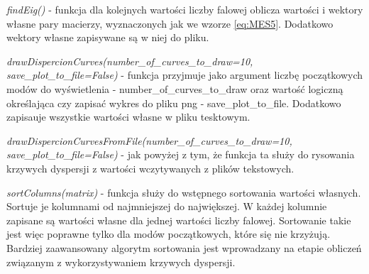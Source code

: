 \vspace {3mm}
\textit{findEig()} - funkcja dla kolejnych wartości liczby falowej oblicza wartości i wektory własne pary macierzy, wyznaczonych jak we wzorze \ref{eq:MES5}. Dodatkowo wektory własne zapisywane są w niej do pliku.

\vspace {3mm}
\textit{drawDispercionCurves(number\_of\_curves\_to\_draw=10, save\_plot\_to\_file=False)} - funkcja przyjmuje jako argument liczbę początkowych modów do wyświetlenia - number\_of\_curves\_to\_draw oraz wartość logiczną określająca czy zapisać wykres do pliku png - save\_plot\_to\_file. Dodatkowo zapisauje wszystkie wartości własne w pliku tesktowym.

\vspace {3mm}
\textit{drawDispercionCurvesFromFile(number\_of\_curves\_to\_draw=10, save\_plot\_to\_file=False)} - jak powyżej z tym, że funkcja ta służy do rysowania krzywych dyspersji z wartości wczytywanych z plików tekstowych.

\vspace {3mm}
\textit{sortColumns(matrix)} - funkcja służy do wstępnego sortowania wartości własnych. Sortuje je kolumnami od najmniejszej do największej. W każdej kolumnie zapisane są wartości własne dla jednej wartości liczby falowej. Sortowanie takie jest więc poprawne tylko dla modów początkowych, które się nie krzyżują. Bardziej zaawansowany algorytm sortowania jest wprowadzany na etapie obliczeń związanym z wykorzystywaniem krzywych dyspersji.
%
%
%
%
%


